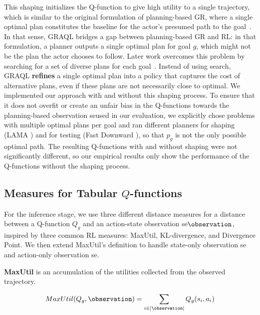 \documentclass[letterpaper]{article} %
\begin{document}
This shaping initializes the Q-function to give high utility to a single trajectory, which is similar to the original formulation of planning-based GR, where a single optimal plan constitutes the baseline for the actor's presumed path to the goal~\cite{ramirez2009plan}.
In that sense, GRAQL bridges a gap between planning-based GR and RL: in that formulation, a planner outputs a single optimal plan for goal $g$, which might not be the plan the actor chooses to follow.
Later work overcomes this problem by searching for a set of diverse plans for each goal~\cite{sohrabi2016plan}.
Instead of using search, GRAQL \textbf{refines} a single optimal plan into a  policy that captures the cost of alternative plans, even if these plans are not necessarily close to optimal.
We implemented our approach with and without this shaping process.
To ensure that it does not overfit or create an unfair bias in the Q-functions towards the planning-based observation seused in our evaluation, we explicitly chose problems with multiple optimal plans per goal and ran different planners for shaping (LAMA \cite{richter2010lama}) and for testing (Fast Downward \cite{helmert2006fast}), so that $p_g$ is not the only possible optimal path.
The resulting Q-functions with and without shaping were not significantly different, so our empirical results only show the performance of the Q-functions without the shaping process.


\subsection{Measures for Tabular $Q$-functions}
For the inference stage, we use three different distance measures for a distance between a Q-function $Q_g$ and an action-state observation se$\observation$, inspired by three common RL measures: MaxUtil, KL-divergence, and Divergence Point.
We then extend MaxUtil's definition to handle state-only observation se and action-only observation se.

\noindent \textbf{MaxUtil} is an accumulation of the utilities collected from the observed trajectory.

\begin{equation}
    MaxUtil(Q_g, \observation) = \displaystyle\sum\limits_{i \in |\observation|} Q_g(s_i,a_i)
\end{equation}
\end{document}
